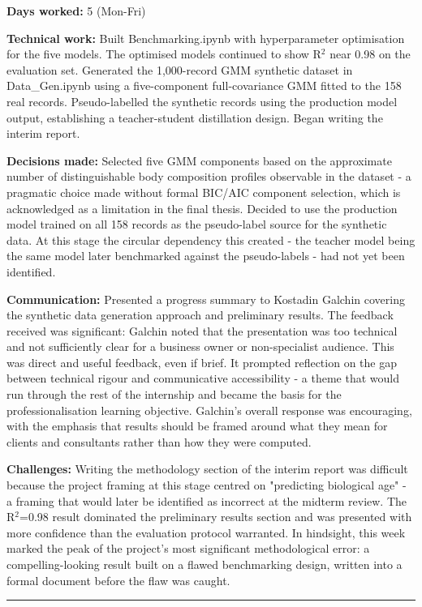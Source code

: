 \documentclass[11pt,a4paper]{article}
\begin{document}
\textbf{Days worked:} 5 (Mon-Fri)

\textbf{Technical work:} Built Benchmarking.ipynb with hyperparameter optimisation for the five models. The optimised models continued to show R$^{2}$ near 0.98 on the evaluation set. Generated the 1,000-record GMM synthetic dataset in Data\_Gen.ipynb using a five-component full-covariance GMM fitted to the 158 real records. Pseudo-labelled the synthetic records using the production model output, establishing a teacher-student distillation design. Began writing the interim report.

\textbf{Decisions made:} Selected five GMM components based on the approximate number of distinguishable body composition profiles observable in the dataset  -  a pragmatic choice made without formal BIC/AIC component selection, which is acknowledged as a limitation in the final thesis. Decided to use the production model trained on all 158 records as the pseudo-label source for the synthetic data. At this stage the circular dependency this created  -  the teacher model being the same model later benchmarked against the pseudo-labels  -  had not yet been identified.

\textbf{Communication:} Presented a progress summary to Kostadin Galchin covering the synthetic data generation approach and preliminary results. The feedback received was significant: Galchin noted that the presentation was too technical and not sufficiently clear for a business owner or non-specialist audience. This was direct and useful feedback, even if brief. It prompted reflection on the gap between technical rigour and communicative accessibility  -  a theme that would run through the rest of the internship and became the basis for the professionalisation learning objective. Galchin's overall response was encouraging, with the emphasis that results should be framed around what they mean for clients and consultants rather than how they were computed.

\textbf{Challenges:} Writing the methodology section of the interim report was difficult because the project framing at this stage centred on "predicting biological age"  -  a framing that would later be identified as incorrect at the midterm review. The R$^{2}$=0.98 result dominated the preliminary results section and was presented with more confidence than the evaluation protocol warranted. In hindsight, this week marked the peak of the project's most significant methodological error: a compelling-looking result built on a flawed benchmarking design, written into a formal document before the flaw was caught.
\noindent\rule{\textwidth}{0.4pt}
\end{document}
